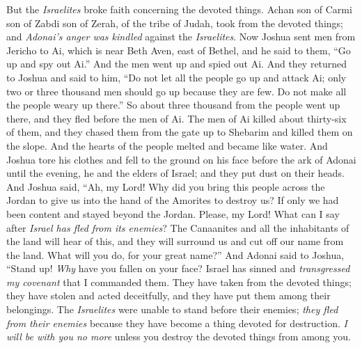 \begin{biblechapter} %
 But the \textit{Israelites} broke faith concerning the devoted things. Achan son of Carmi son of Zabdi son of Zerah, of the tribe of Judah, took from the devoted things; and \textit{Adonai’s anger was kindled} against the \textit{Israelites}.
\verse Now Joshua sent men from Jericho to Ai, which is near Beth Aven, east of Bethel, and he said to them, “Go up and spy out Ai.” And the men went up and spied out Ai.
\verse And they returned to Joshua and said to him, “Do not let all the people go up and attack Ai; only two or three thousand men should go up because they are few. Do not make all the people weary up there.”
\verse So about three thousand from the people went up there, and they fled before the men of Ai.
\verse The men of Ai killed about thirty-six of them, and they chased them from the gate up to Shebarim and killed them on the slope. And the hearts of the people melted and became like water.
\verse And Joshua tore his clothes and fell to the ground on his face before the ark of Adonai until the evening, he and the elders of Israel; and they put dust on their heads.
\verse And Joshua said, “Ah, my Lord! Why did you bring this people across the Jordan to give us into the hand of the Amorites to destroy us? If only we had been content and stayed beyond the Jordan.
\verse Please, my Lord! What can I say after \textit{Israel has fled from its enemies}?
\verse The Canaanites and all the inhabitants of the land will hear of this, and they will surround us and cut off our name from the land. What will you do, for your great name?”
\verse And Adonai said to Joshua, “Stand up! \textit{Why} have you fallen on your face?
\verse Israel has sinned and \textit{transgressed my covenant} that I commanded them. They have taken from the devoted things; they have stolen and acted deceitfully, and they have put them among their belongings.
\verse The \textit{Israelites} were unable to stand before their enemies; \textit{they fled from their enemies} because they have become a thing devoted for destruction. \textit{I will be with you no more} unless you destroy the devoted things from among you.

\end{biblechapter}
